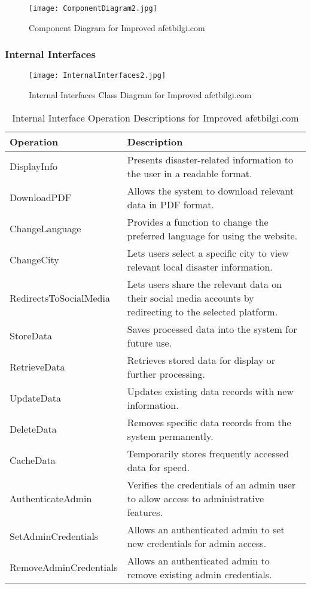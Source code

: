 \documentclass[12pt, letterpaper]{article}
\begin{document}
\begin{figure}[H]
\centering
\texttt{[image: ComponentDiagram2.jpg]}
\caption{Component Diagram for Improved afetbilgi.com}
\end{figure}

\subsubsection{Internal Interfaces}

\begin{figure}[H]
\centering
\texttt{[image: InternalInterfaces2.jpg]}
\caption{Internal Interfaces Class Diagram for Improved afetbilgi.com}
\end{figure}

\begin{table}[H]
    \centering
    \begin{tabular}{|l|p{11cm}|}
        \hline
        \textbf{Operation} & \textbf{Description} \\
        \hline 
        DisplayInfo & Presents disaster-related information to the user in a readable format. \\
        \hline
        DownloadPDF & Allows the system to download relevant data in PDF format. \\
        \hline
        ChangeLanguage & Provides a function to change the preferred language for using the website. \\
        \hline 
        ChangeCity & Lets users select a specific city to view relevant local disaster information. \\
        \hline
        RedirectsToSocialMedia & Lets users share the relevant data on their social media accounts by redirecting to the selected platform. \\
        \hline
        StoreData & Saves processed data into the system for future use. \\
        \hline
        RetrieveData & Retrieves stored data for display or further processing. \\
        \hline
        UpdateData & Updates existing data records with new information. \\
        \hline
        DeleteData & Removes specific data records from the system permanently. \\
        \hline
        CacheData & Temporarily stores frequently accessed data for speed. \\
        \hline
        AuthenticateAdmin & Verifies the credentials of an admin user to allow access to administrative features. \\
        \hline
        SetAdminCredentials & Allows an authenticated admin to set new credentials for admin access. \\
        \hline
        RemoveAdminCredentials & Allows an authenticated admin to remove existing admin credentials. \\
        \hline
    \end{tabular}
    \caption{Internal Interface Operation Descriptions for Improved afetbilgi.com}
    \label{tab:operations}
\end{table}
\end{document}
